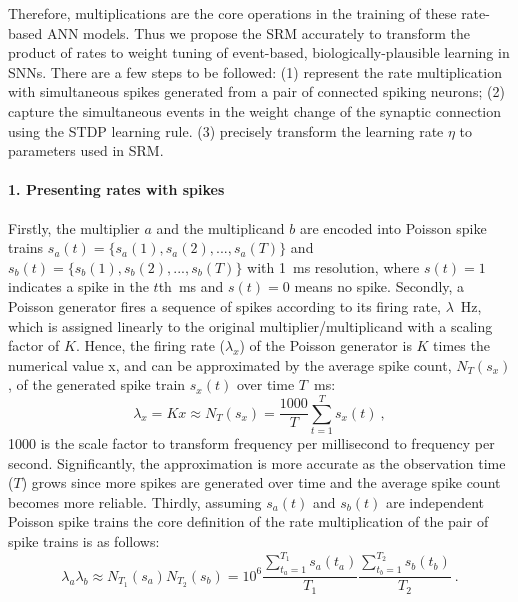 Therefore, multiplications are the core operations in the training of these rate-based ANN models.
Thus we propose the SRM accurately to transform the product of rates to weight tuning of event-based, biologically-plausible learning in SNNs.
There are a few steps to be followed: (1) represent the rate multiplication with simultaneous spikes generated from a pair of connected spiking neurons;
(2) capture the simultaneous events in the weight change of the synaptic connection using the STDP learning rule.
(3) precisely transform the learning rate $\eta$ to parameters used in SRM.

\paragraph{1. Presenting rates with spikes\\}
Firstly, the multiplier $a$ and the multiplicand $b$ are encoded into Poisson spike trains $s_a(t)=\{s_a(1),s_a(2),...,s_a(T)\}$ and $s_b(t)=\{s_b(1),s_b(2),...,s_b(T)\}$ with 1~ms resolution, where $s(t)=1$ indicates a spike in the $t$th~ms and $s(t)=0$ means no spike.
Secondly, a Poisson generator fires a sequence of spikes according to its firing rate, $\lambda$~Hz, which is assigned linearly to the original multiplier/multiplicand with a scaling factor of $K$.
Hence, the firing rate ($\lambda_x$) of the Poisson generator is $K$ times the numerical value x, and can be approximated by the average spike count, $N_T(s_x)$, of the generated spike train $s_x(t)$ over time $T$~ms:
\begin{equation}
\lambda_x = Kx \approx N_T(s_x) = \frac{1000}{T} \sum_{t=1}^{T} s_x(t)~,
\end{equation} 
1000 is the scale factor to transform frequency per millisecond to frequency per second.
Significantly, the approximation is more accurate as the observation time ($T$) grows since more spikes are generated over time and the average spike count becomes more reliable.
Thirdly, assuming $s_a(t)$ and $s_b(t)$ are independent Poisson spike trains the core definition of the rate multiplication of the pair of spike trains is as follows:
\begin{equation}
\lambda_a \lambda_b \approx N_{T_1}(s_a)N_{T_2}(s_b)= 10^6 \frac{\sum_{t_a=1}^{T_1}s_a(t_a)}{T_1}  \frac{\sum_{t_b=1}^{T_2} s_b(t_b)}{T_2}~.
\label{equ:mul}
\end{equation} 

